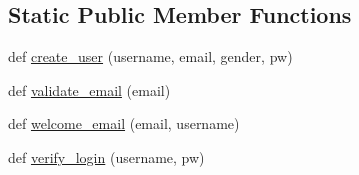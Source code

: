 \subsection*{Static Public Member Functions}
\begin{DoxyCompactItemize}
\item 
def \mbox{\hyperlink{classprodigal__app_1_1models_1_1_user_ae3403ac05c2b1c1b79054ce6e4596927}{create\+\_\+user}} (username, email, gender, pw)
\item 
def \mbox{\hyperlink{classprodigal__app_1_1models_1_1_user_af782c74fbc6e55cf3d34f63e46e79cdf}{validate\+\_\+email}} (email)
\item 
def \mbox{\hyperlink{classprodigal__app_1_1models_1_1_user_ad25d6d4f8c0c53f5ed0ea932d1ab6b60}{welcome\+\_\+email}} (email, username)
\item 
def \mbox{\hyperlink{classprodigal__app_1_1models_1_1_user_a68a3edc5a30e752a1f87b54b7dbe3a46}{verify\+\_\+login}} (username, pw)
\end{DoxyCompactItemize}
